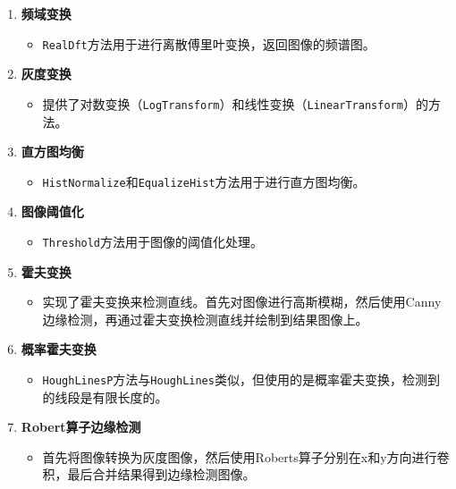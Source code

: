\documentclass[UTF8,openany]{ctexbook}
\begin{document}
\begin{enumerate}[label=\arabic*., leftmargin=*]
  \item \textbf{频域变换}
    \begin{itemize}[label=--, leftmargin=*]
      \item \texttt{RealDft}方法用于进行离散傅里叶变换，返回图像的频谱图。
    \end{itemize}
  
  \item \textbf{灰度变换}
    \begin{itemize}[label=--, leftmargin=*]
      \item 提供了对数变换（\texttt{LogTransform}）和线性变换（\texttt{LinearTransform}）的方法。
    \end{itemize}
  
  \item \textbf{直方图均衡}
    \begin{itemize}[label=--, leftmargin=*]
      \item \texttt{HistNormalize}和\texttt{EqualizeHist}方法用于进行直方图均衡。
    \end{itemize}
  
  \item \textbf{图像阈值化}
    \begin{itemize}[label=--, leftmargin=*]
      \item \texttt{Threshold}方法用于图像的阈值化处理。
    \end{itemize}
  
  \item \textbf{霍夫变换}
    \begin{itemize}[label=--, leftmargin=*]
      \item 实现了霍夫变换来检测直线。首先对图像进行高斯模糊，然后使用Canny边缘检测，再通过霍夫变换检测直线并绘制到结果图像上。
    \end{itemize}
  
  \item \textbf{概率霍夫变换}
    \begin{itemize}[label=--, leftmargin=*]
      \item \texttt{HoughLinesP}方法与\texttt{HoughLines}类似，但使用的是概率霍夫变换，检测到的线段是有限长度的。
    \end{itemize}
  
  \item \textbf{Robert算子边缘检测}
    \begin{itemize}[label=--, leftmargin=*]
      \item 首先将图像转换为灰度图像，然后使用Roberts算子分别在x和y方向进行卷积，最后合并结果得到边缘检测图像。
    \end{itemize}
  

\end{enumerate}
\end{document}
